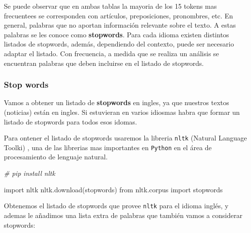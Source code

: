 \documentclass[
  11pt,
  a4paper,
]{article}
\newenvironment{Shaded}{\begin{snugshade}}{\end{snugshade}}
\newcommand{\CommentTok}[1]{\textcolor[rgb]{0.56,0.35,0.01}{\textit{#1}}}
\newcommand{\ImportTok}[1]{#1}
\newcommand{\NormalTok}[1]{#1}
\newcommand{\StringTok}[1]{\textcolor[rgb]{0.31,0.60,0.02}{#1}}
\begin{document}
Se puede observar que en ambas tablas la mayoria de los 15 tokens mas
frecuentees se corresponden con artículos, preposiciones, pronombres,
etc. En general, palabras que no aportan información relevante sobre el
texto. A estas palabras se les conoce como \textbf{stopwords}. Para cada
idioma existen distintos listados de stopwords, además, dependiendo del
contexto, puede ser necesario adaptar el listado. Con frecuencia, a
medida que se realiza un análisis se encuentran palabras que deben
incluirse en el listado de stopwords.

\hypertarget{stop-words}{%
\subsubsection{Stop words}\label{stop-words}}

Vamos a obtener un listado de \textbf{stopwords} en ingles, ya que
nuestros textos (noticias) están en ingles. Si estuvieran en varios
idiosmas habra que formar un listado de stopwords para todos esos
idomas.

Para ontener el listado de stopwords usaremos la libreria \texttt{nltk}
(Natural Language Toolki) , una de las librerias mas importantes en
\texttt{Python} en el área de procesamiento de lenguaje natural.

\begin{Shaded}
\begin{Highlighting}[]
\CommentTok{\# pip install nltk}
\end{Highlighting}
\end{Shaded}

\begin{Shaded}
\begin{Highlighting}[]
\ImportTok{import}\NormalTok{ nltk}
\NormalTok{nltk.download(}\StringTok{\textquotesingle{}stopwords\textquotesingle{}}\NormalTok{)}
\ImportTok{from}\NormalTok{ nltk.corpus }\ImportTok{import}\NormalTok{ stopwords}
\end{Highlighting}
\end{Shaded}

Obtenemos el listado de stopwords que provee \texttt{nltk} para el
idioma inglés, y ademas le añadimos una lista extra de palabras que
también vamos a considerar stopwords:
\end{document}

